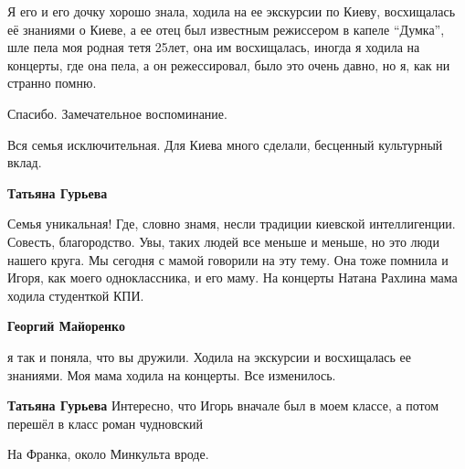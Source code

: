  
 
 
 
 


Я его и его дочку хорошо знала, ходила на ее экскурсии по Киеву, восхищалась её
знаниями о Киеве, а ее отец был известным режиссером в капеле \enquote{Думка}, шле пела
моя родная тетя 25лет, она им восхищалась, иногда я ходила на концерты, где она
пела, а он режессировал, было это очень давно, но я, как ни странно помню.


Спасибо. Замечательное воспоминание.

Вся семья исключительная. Для Киева много сделали, бесценный культурный вклад.

\begin{itemize} %
\textbf{Татьяна Гурьева} 

Семья уникальная! Где, словно знамя, несли традиции киевской интеллигенции.
Совесть, благородство. Увы, таких людей все меньше и меньше, но это люди нашего
круга. Мы сегодня с мамой говорили на эту тему. Она тоже помнила и Игоря, как
моего одноклассника, и его маму. На концерты Натана Рахлина мама ходила
студенткой КПИ.

\textbf{Георгий Майоренко} 

я так и поняла, что вы дружили. Ходила на экскурсии и восхищалась ее знаниями.
Моя мама ходила на концерты. Все изменилось.

\textbf{Татьяна Гурьева} Интересно, что Игорь вначале был в моем классе, а потом перешёл в класс роман чудновский
\end{itemize} %

На Франка, около Минкульта вроде.
